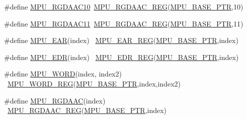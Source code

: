 \begin{DoxyCompactItemize}
\item 
\#define \hyperlink{group___m_p_u___register___accessor___macros_ga292b1e644a869d87a8d3b3cccb3238a9}{M\+P\+U\+\_\+\+R\+G\+D\+A\+A\+C10}~\hyperlink{group___m_p_u___register___accessor___macros_ga23cb65d4881e41613a4fc75dda589b13}{M\+P\+U\+\_\+\+R\+G\+D\+A\+A\+C\+\_\+\+R\+EG}(\hyperlink{group___m_p_u___peripheral_gae2d60f80178d84225d77e5f0214d1f1d}{M\+P\+U\+\_\+\+B\+A\+S\+E\+\_\+\+P\+TR},10)
\item 
\#define \hyperlink{group___m_p_u___register___accessor___macros_gae07692fb12f583bba1af90aeb1895c73}{M\+P\+U\+\_\+\+R\+G\+D\+A\+A\+C11}~\hyperlink{group___m_p_u___register___accessor___macros_ga23cb65d4881e41613a4fc75dda589b13}{M\+P\+U\+\_\+\+R\+G\+D\+A\+A\+C\+\_\+\+R\+EG}(\hyperlink{group___m_p_u___peripheral_gae2d60f80178d84225d77e5f0214d1f1d}{M\+P\+U\+\_\+\+B\+A\+S\+E\+\_\+\+P\+TR},11)
\item 
\#define \hyperlink{group___m_p_u___register___accessor___macros_gaf23e635efc6023dbffa5815bef3b0e97}{M\+P\+U\+\_\+\+E\+AR}(index)                                                  ~\hyperlink{group___m_p_u___register___accessor___macros_gafde49426a0663bf8cbd3b327071d5244}{M\+P\+U\+\_\+\+E\+A\+R\+\_\+\+R\+EG}(\hyperlink{group___m_p_u___peripheral_gae2d60f80178d84225d77e5f0214d1f1d}{M\+P\+U\+\_\+\+B\+A\+S\+E\+\_\+\+P\+TR},index)
\item 
\#define \hyperlink{group___m_p_u___register___accessor___macros_ga50da449922c4ff9bdda167bba9e12498}{M\+P\+U\+\_\+\+E\+DR}(index)                                                  ~\hyperlink{group___m_p_u___register___accessor___macros_gab5f1a86206f206716183f511c3530425}{M\+P\+U\+\_\+\+E\+D\+R\+\_\+\+R\+EG}(\hyperlink{group___m_p_u___peripheral_gae2d60f80178d84225d77e5f0214d1f1d}{M\+P\+U\+\_\+\+B\+A\+S\+E\+\_\+\+P\+TR},index)
\item 
\#define \hyperlink{group___m_p_u___register___accessor___macros_ga647e834ed4b9989ae28b0d9fc4f99839}{M\+P\+U\+\_\+\+W\+O\+RD}(index,  index2)                                  ~\hyperlink{group___m_p_u___register___accessor___macros_ga4bd0f804682db1d2e2887f98b3e45e72}{M\+P\+U\+\_\+\+W\+O\+R\+D\+\_\+\+R\+EG}(\hyperlink{group___m_p_u___peripheral_gae2d60f80178d84225d77e5f0214d1f1d}{M\+P\+U\+\_\+\+B\+A\+S\+E\+\_\+\+P\+TR},index,index2)
\item 
\#define \hyperlink{group___m_p_u___register___accessor___macros_ga530fd57aa72634b1863ddf25ea5a1ceb}{M\+P\+U\+\_\+\+R\+G\+D\+A\+AC}(index)                                            ~\hyperlink{group___m_p_u___register___accessor___macros_ga23cb65d4881e41613a4fc75dda589b13}{M\+P\+U\+\_\+\+R\+G\+D\+A\+A\+C\+\_\+\+R\+EG}(\hyperlink{group___m_p_u___peripheral_gae2d60f80178d84225d77e5f0214d1f1d}{M\+P\+U\+\_\+\+B\+A\+S\+E\+\_\+\+P\+TR},index)
\end{DoxyCompactItemize}


